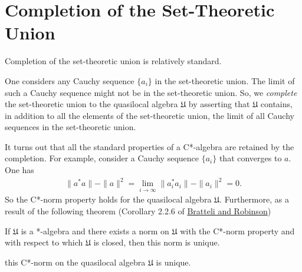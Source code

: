 \section{Completion of the Set-Theoretic Union}\label{sctn:completion-of-the-set-theoretic-union}
Completion of the set-theoretic union is relatively standard.

One considers any Cauchy sequence $\{a_i\}$ in the set-theoretic union. The limit of such a Cauchy sequence might not be in the set-theoretic union. So, we \textit{complete} the set-theoretic union to the quasilocal algebra $\mathfrak{U}$ by asserting that $\mathfrak{U}$ contains, in addition to all the elements of the set-theoretic union, the limit of all Cauchy sequences in the set-theoretic union.

It turns out that all the standard properties of a C*-algebra are retained by the completion. For example, consider a Cauchy sequence $\{a_i\}$ that converges to $a$. One has
\begin{align}
    \|a^*a\| - \|a\|^2 = \lim\limits_{i \rightarrow \infty} \|a_i^*a_i\| - \|a_i\|^2 = 0.
\end{align}
So the C*-norm property holds for the quasilocal algebra $\mathfrak{U}$. Furthermore, as a result of the following theorem (Corollary 2.2.6 of \href{https://doi.org/10.1007/978-3-662-02520-8}{Bratteli and Robinson})
\begin{theorem}
    If $\mathfrak{U}$ is a *-algebra and there exists a norm on $\mathfrak{U}$ with the C*-norm property and with respect to which $\mathfrak{U}$ is closed, then this norm is unique.
\end{theorem}
\noindent this C*-norm on the quasilocal algebra $\mathfrak{U}$ is unique.
